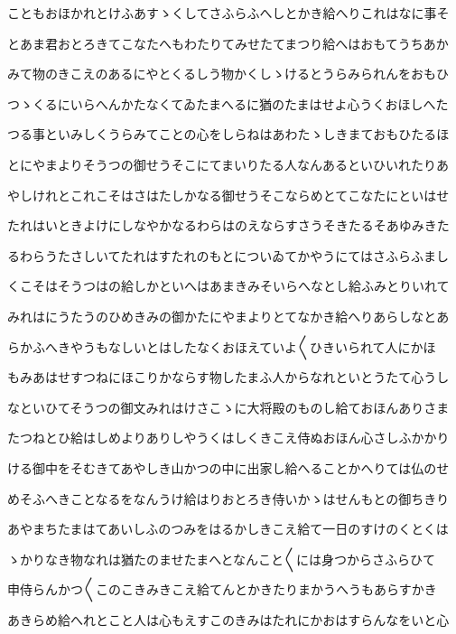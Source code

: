 \documentclass[a4paper,11pt,landscape]{ltjtarticle}
\begin{document}
\par\medskip
こともおほかれとけふあすゝくしてさふらふへしとかき給へりこれはなに事そ
\par\medskip
とあま君おとろきてこなたへもわたりてみせたてまつり給へはおもてうちあか
\par\medskip
みて物のきこえのあるにやとくるしう物かくしゝけるとうらみられんをおもひ
\par\medskip
つゝくるにいらへんかたなくてゐたまへるに猶のたまはせよ心うくおほしへた
\par\medskip
つる事といみしくうらみてことの心をしらねはあわたゝしきまておもひたるほ
\par\medskip
とにやまよりそうつの御せうそこにてまいりたる人なんあるといひいれたりあ
\par\medskip
やしけれとこれこそはさはたしかなる御せうそこならめとてこなたにといはせ
\par\medskip
たれはいときよけにしなやかなるわらはのえならすさうそきたるそあゆみきた
\par\medskip
るわらうたさしいてたれはすたれのもとについゐてかやうにてはさふらふまし
\par\medskip
くこそはそうつはの給しかといへはあまきみそいらへなとし給ふみとりいれて
\par\medskip
みれはにうたうのひめきみの御かたにやまよりとてなかき給へりあらしなとあ
\par\medskip
らかふへきやうもなしいとはしたなくおほえていよ〱ひきいられて人にかほ
\par\medskip
もみあはせすつねにほこりかならす物したまふ人からなれといとうたて心うし
\par\medskip
なといひてそうつの御文みれはけさこゝに大将殿のものし給ておほんありさま
\par\medskip
たつねとひ給はしめよりありしやうくはしくきこえ侍ぬおほん心さしふかかり
\par\medskip
ける御中をそむきてあやしき山かつの中に出家し給へることかへりては仏のせ
\par\medskip
めそふへきことなるをなんうけ給はりおとろき侍いかゝはせんもとの御ちきり
\par\medskip
あやまちたまはてあいしふのつみをはるかしきこえ給て一日のすけのくとくは
\par\medskip
ゝかりなき物なれは猶たのませたまへとなんこと〱には身つからさふらひて
\par\medskip
申侍らんかつ〱このこきみきこえ給てんとかきたりまかうへうもあらすかき
\par\medskip
あきらめ給へれとこと人は心もえすこのきみはたれにかおはすらんなをいと心
\par\medskip
\end{document}
